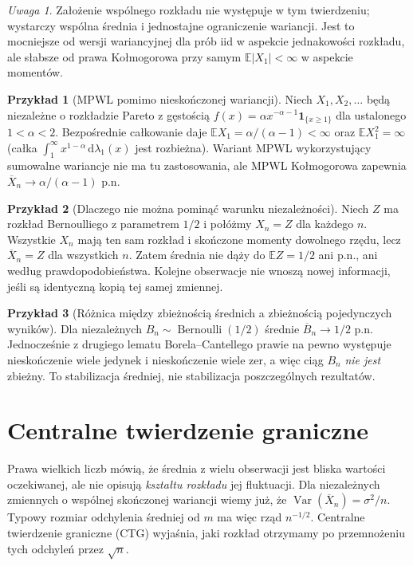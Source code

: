 \documentclass[11pt,a4paper,oneside]{report}
\numberwithin{equation}{chapter}
\theoremstyle{plain}
\theoremstyle{definition}
\newtheorem{przyklad}{Przykład}[chapter]
\theoremstyle{remark}
\newtheorem{uwaga}{Uwaga}[chapter]
\newcommand{\E}{\mathbb{E}}
\newcommand{\Var}{\operatorname{Var}}
\newcommand{\ind}[1]{\mathbf{1}_{#1}}
\newcommand{\dd}{\mathrm{d}}
\begin{document}
\begin{uwaga}
Założenie wspólnego rozkładu nie występuje w tym
twierdzeniu; wystarczy wspólna średnia i jednostajne
ograniczenie wariancji. Jest to mocniejsze od
wersji wariancyjnej dla prób iid w aspekcie
jednakowości rozkładu, ale słabsze od prawa Kołmogorowa
przy samym $\E|X_1|<\infty$ w aspekcie momentów.
\end{uwaga}

\begin{przyklad}[MPWL pomimo nieskończonej wariancji]
Niech $X_1,X_2,\ldots$ będą niezależne o rozkładzie
Pareto z gęstością
$f(x)=\alpha x^{-\alpha-1}\ind{\{x\geq1\}}$
dla ustalonego $1<\alpha<2$. Bezpośrednie całkowanie daje
$\E X_1=\alpha/(\alpha-1)<\infty$ oraz
$\E X_1^2=\infty$ (całka
$\int_1^\infty x^{1-\alpha}\,\dd\lambda_1(x)$
jest rozbieżna). Wariant MPWL wykorzystujący
sumowalne wariancje nie ma tu zastosowania, ale
MPWL Kołmogorowa zapewnia
$\overline X_n\to\alpha/(\alpha-1)$ p.n.
\end{przyklad}

\begin{przyklad}[Dlaczego nie można pominąć warunku niezależności]
Niech $Z$ ma rozkład Bernoulliego z parametrem $1/2$
i połóżmy $X_n=Z$ dla każdego $n$. Wszystkie $X_n$
mają ten sam rozkład i skończone momenty dowolnego
rzędu, lecz $\overline X_n=Z$ dla wszystkich $n$.
Zatem średnia nie dąży do $\E Z=1/2$ ani p.n.,
ani według prawdopodobieństwa. Kolejne obserwacje
nie wnoszą nowej informacji, jeśli są identyczną
kopią tej samej zmiennej.
\end{przyklad}

\begin{przyklad}[Różnica między zbieżnością średnich a zbieżnością pojedynczych wyników]
Dla niezależnych $B_n\sim\operatorname{Bernoulli}(1/2)$
średnie $\overline B_n\to1/2$ p.n. Jednocześnie
z drugiego lematu Borela--Cantellego prawie na pewno
występuje nieskończenie wiele jedynek i nieskończenie
wiele zer, a więc ciąg $B_n$ \emph{nie jest} zbieżny.
To stabilizacja średniej, nie stabilizacja
poszczególnych rezultatów.
\end{przyklad}

\chapter{Centralne twierdzenie graniczne}
\label{ch:clt}

Prawa wielkich liczb mówią, że średnia z wielu obserwacji
jest bliska wartości oczekiwanej, ale nie opisują
\emph{kształtu rozkładu} jej fluktuacji. Dla niezależnych
zmiennych o wspólnej skończonej wariancji wiemy już, że
$\Var(\overline X_n)=\sigma^2/n$.
Typowy rozmiar odchylenia średniej od $m$ ma więc rząd
$n^{-1/2}$. Centralne twierdzenie graniczne (CTG)
wyjaśnia, jaki rozkład otrzymamy po przemnożeniu
tych odchyleń przez $\sqrt n$.
\end{document}
